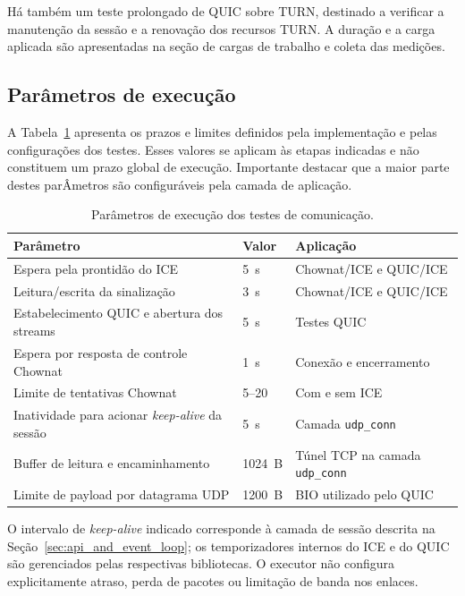 Há também um teste prolongado de QUIC sobre TURN, destinado a verificar a manutenção da sessão e a renovação dos recursos TURN. A duração e a carga aplicada são apresentadas na seção de cargas de trabalho e coleta das medições.

\subsection{Parâmetros de execução}

A Tabela~\ref{tab:experimental_parameters} apresenta os prazos e limites definidos pela implementação e pelas configurações dos testes. Esses valores se aplicam às etapas indicadas e não constituem um prazo global de execução. Importante destacar que a maior parte destes parÂmetros são configuráveis pela camada de aplicação.

\begin{table}[htbp]
    \centering
    \caption{Parâmetros de execução dos testes de comunicação.}
    \label{tab:experimental_parameters}
    \begin{tabular}{@{}p{}p{}p{}@{}}
        \toprule
        \textbf{Parâmetro} &
        \textbf{Valor} &
        \textbf{Aplicação} \\
        \midrule
        Espera pela prontidão do ICE &
        5~s & Chownat/ICE e QUIC/ICE \\
        Leitura/escrita da sinalização &
        3~s & Chownat/ICE e QUIC/ICE \\
        Estabelecimento QUIC e abertura dos streams &
        5~s & Testes QUIC \\
        Espera por resposta de controle Chownat &
        1~s & Conexão e encerramento \\
        Limite de tentativas Chownat &
        5--20 & Com e sem ICE \\
        Inatividade para acionar \textit{keep-alive}
        da sessão &
        5~s & Camada \texttt{udp\_conn} \\
        Buffer de leitura e encaminhamento &
        1024~B & Túnel TCP na camada \texttt{udp\_conn} \\
        Limite de payload por datagrama UDP &
        1200~B & BIO utilizado pelo QUIC \\
        \bottomrule
    \end{tabular}
\end{table}

O intervalo de \textit{keep-alive} indicado corresponde à camada de sessão descrita na
Seção~\ref{sec:api_and_event_loop}; os temporizadores internos do ICE e do QUIC são gerenciados pelas respectivas bibliotecas. O executor não configura explicitamente atraso, perda de pacotes ou limitação de banda nos enlaces.

